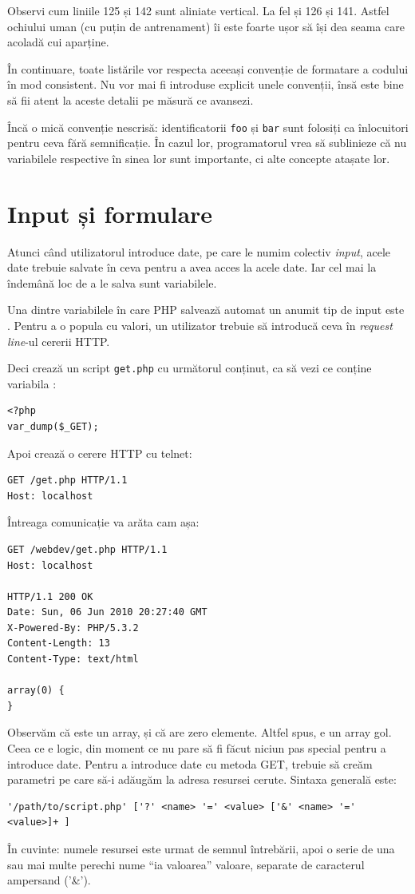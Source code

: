 Observi cum liniile 125 și 142 sunt aliniate vertical. La fel și 126 și 141. Astfel ochiului uman (cu puțin de antrenament)
îi este foarte ușor să își dea seama care acoladă cui aparține.

În continuare, toate listările vor respecta aceeași convenție de formatare a codului
în mod consistent. Nu vor mai fi introduse explicit unele convenții, însă este bine să fii atent
la aceste detalii pe măsură ce avansezi.

Încă o mică convenție nescrisă: identificatorii \texttt{foo} și \texttt{bar} sunt folosiți ca înlocuitori
pentru ceva fără semnificație. În cazul lor, programatorul vrea să sublinieze că nu variabilele respective
în sinea lor sunt importante, ci alte concepte atașate lor.

\section{Input și formulare}
Atunci când utilizatorul introduce date, pe care le numim colectiv \textsl{input},
acele date trebuie salvate în ceva pentru a avea acces la acele date. Iar cel
mai la îndemână loc de a le salva sunt variabilele.

Una dintre variabilele în care PHP salvează automat un anumit tip de input este \get.
Pentru a o popula cu valori, un utilizator trebuie să introducă ceva în \textsl{request line}-ul
cererii HTTP.

Deci crează un script \texttt{get.php} cu următorul conținut, ca să vezi ce conține variabila \get:
\begin{lstlisting}
<?php
var_dump($_GET);
\end{lstlisting}
Apoi crează o cerere HTTP cu telnet:
\begin{verbatim}
GET /get.php HTTP/1.1
Host: localhost

\end{verbatim}
Întreaga comunicație va arăta cam așa:
\begin{verbatim}
GET /webdev/get.php HTTP/1.1
Host: localhost

HTTP/1.1 200 OK
Date: Sun, 06 Jun 2010 20:27:40 GMT
X-Powered-By: PHP/5.3.2
Content-Length: 13
Content-Type: text/html

array(0) {
}
\end{verbatim}
Observăm că {\get} este un array, și că are zero elemente. Altfel spus,
e un array gol. Ceea ce e logic, din moment ce nu pare să fi făcut niciun
pas special pentru a introduce date. Pentru a introduce date cu metoda GET,
trebuie să creăm parametri pe care să-i adăugăm la adresa resursei cerute.
Sintaxa generală este:
\begin{verbatim}
'/path/to/script.php' ['?' <name> '=' <value> ['&' <name> '=' <value>]+ ]
\end{verbatim}
În cuvinte: numele resursei este urmat de semnul întrebării, apoi o serie de
una sau mai multe perechi nume ``ia valoarea'' valoare, separate de caracterul
ampersand ('\&').


